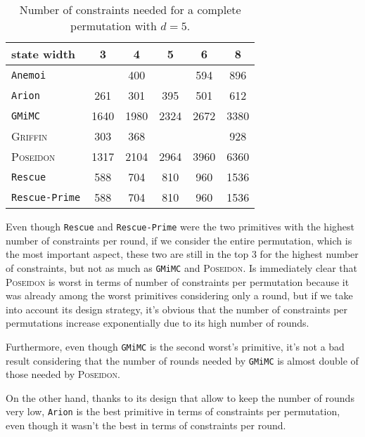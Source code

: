 \documentclass[12pt, a4paper]{report}
\begin{document}
\begin{table}[H]
  \begin{center}
    \begin{tabular}{|l|c|c|c|c|c|}
      \hline
        state width & 3 & 4 & 5 & 6 & 8 \\
      \hline
        \texttt{Anemoi} & & 400 & & 594 & 896 \\
        \texttt{Arion} & \cellcolor{green!35} 261 & 301 & 395 & 501 & 612 \\
        \texttt{GMiMC} & \cellcolor{orange!35} 1640 & \cellcolor{orange!35} 1980 & \cellcolor{orange!35} 2324 & \cellcolor{orange!35} 2672 & \cellcolor{orange!35} 3380 \\
        \textsc{Griffin} & 303 & 368 & & & 928 \\
        \textsc{Poseidon} & \cellcolor{orange!35} 1317 & \cellcolor{orange!35} 2104 & \cellcolor{orange!35} 2964 & \cellcolor{orange!35} 3960 & \cellcolor{red!35} 6360 \\
        \texttt{Rescue} & 588 & 704 & 810 & 960 & \cellcolor{orange!35} 1536 \\
        \texttt{Rescue-Prime} & 588 & 704 & 810 & 960 & \cellcolor{orange!35} 1536 \\
      \hline
    \end{tabular}
  \end{center}
  \caption{Number of constraints needed for a complete permutation with $d = 5$.}\label{tab:constraintsperm}
\end{table}

Even though \texttt{Rescue} and \texttt{Rescue-Prime} were the two primitives with the highest number of constraints per round, if we consider the entire permutation, which is the most important aspect, these two are still in the top 3 for the highest number of constraints, but not as much as \texttt{GMiMC} and \textsc{Poseidon}.
Is immediately clear that \textsc{Poseidon} is worst in terms of number of constraints per permutation because it was already among the worst primitives considering only a round, but if we take into account its design strategy, it's obvious that the number of constraints per permutations increase exponentially due to its high number of rounds.

Furthermore, even though \texttt{GMiMC} is the second worst's primitive, it's not a bad result considering that the number of rounds needed by \texttt{GMiMC} is almost double of those needed by \textsc{Poseidon}.

On the other hand, thanks to its design that allow to keep the number of rounds very low, \texttt{Arion} is the best primitive in terms of constraints per permutation, even though it wasn't the best in terms of constraints per round.
\end{document}
